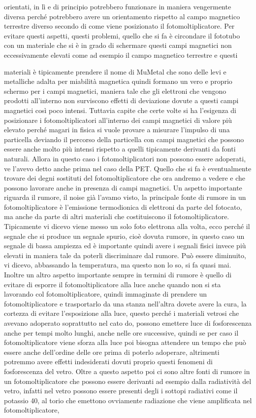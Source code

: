 {orientati, in lì e di principio potrebbero funzionare in maniera vengermente diversa perché potrebbero avere un orientamento rispetto al campo magnetico terrestre diverso secondo di come viene posizionato il fotomoltiplicatore. Per evitare questi aspetti, questi problemi, quello che si fa è circondare il fototubo con un materiale che si è in grado di schermare questi campi magnetici non eccessivamente elevati come ad esempio il campo magnetico terrestre e questi

materiali è tipicamente prendere il nome di MuMetal che sono delle levi e metalliche adalta per miabilità magnetica quindi formano un vero e proprio schermo per i campi magnetici, maniera tale che gli elettroni che vengono prodotti all'interno non surviscono effetti di deviazione dovute a questi campi magnetici così poco intensi. Tuttavia capite che certe volte si ha l'esigenza di posizionare i fotomoltiplicatori all'interno dei campi magnetici di valore più elevato perché magari in fisica si vuole provare a misurare l'impulso di una particella deviando il percorso della particella con campi magnetici che possono essere anche molto più intensi rispetto a quelli tipicamente derivanti da fonti naturali. Allora in questo caso i fotomoltiplicatori non possono essere adoperati, ve l'avevo detto anche prima nel caso della PET. Quello che si fa è eventualmente trovare dei degni sostituti del fotomoltiplicatore che ora andremo a vedere e che possono lavorare anche in presenza di campi magnetici. Un aspetto importante riguarda il rumore, il noise già l'avamo visto, la principale fonte di rumore in un fotomoltiplicatore è l'emissione termodionica di elettroni da parte del fotocato, ma anche da parte di altri materiali che costituiscono il fotomoltiplicatore. Tipicamente vi dicevo viene messo un solo foto elettrona alla volta, ecco perché il segnale che si produce un segnale spurio, cioè dovuta rumore, in questo caso un segnale di bassa ampiezza ed è importante quindi avere i segnali fisici invece più elevati in maniera tale da poterli discriminare dal rumore. Può essere diminuito, vi dicevo, abbassando la temperatura, ma questo non lo so, si fa quasi mai. Inoltre un altro aspetto importante sempre in termini di rumore è quello di evitare di esporre il fotomoltiplicatore alla luce anche quando non si sta lavorando col fotomoltiplicatore, quindi immaginate di prendere un fotomoltiplicatore e trasportarlo da una stanza nell'altra dovete avere la cura, la cortezza di evitare l'esposizione alla luce, questo perché i materiali vetrosi che avevano adoperato soprattutto nel cato do, possono emettere luce di fosforescenza anche per tempi molto lunghi, anche nelle ore successive, quindi se per caso il fotomoltiplicatore viene sforza alla luce poi bisogna attendere un tempo che può essere anche dell'ordine delle ore prima di poterlo adoperare, altrimenti potremmo avere effetti indesiderati dovuti proprio questi fenomeni di fosforescenza del vetro. Oltre a questo aspetto poi ci sono altre fonti di rumore in un fotomoltiplicatore che possono essere derivanti ad esempio dalla radiatività del vetro, infatti nel vetro possono essere presenti degli i sottopi radiativi come il potassio 40, al torio che emettono ovviamente radiazione che viene amplificata nel fotomoltiplicatore, }
